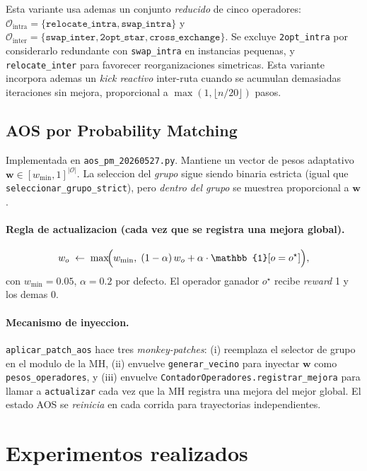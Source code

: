 \documentclass[11pt,a4paper]{article}
\newcommand{\mh}{MH}
\newcommand{\op}[1]{\texttt{#1}}
\newcommand{\code}[1]{\texttt{#1}}
\begin{document}
Esta variante usa ademas un conjunto \emph{reducido} de cinco
operadores: $\mathcal{O}_{\text{intra}}=\{\op{relocate\_intra},
\op{swap\_intra}\}$ y $\mathcal{O}_{\text{inter}}=\{\op{swap\_inter},
\op{2opt\_star}, \op{cross\_exchange}\}$. Se excluye \op{2opt\_intra}
por considerarlo redundante con \op{swap\_intra} en instancias
pequenas, y \op{relocate\_inter} para favorecer reorganizaciones
simetricas. Esta variante incorpora ademas un \emph{kick reactivo}
inter-ruta cuando se acumulan demasiadas iteraciones sin mejora,
proporcional a $\max(1, \lfloor n/20\rfloor)$ pasos.

\subsection{AOS por Probability Matching}

Implementada en \code{aos\_pm\_20260527.py}. Mantiene un vector de
pesos adaptativo $\mathbf{w}\in[w_{\min},1]^{|\mathcal{O}|}$. La
seleccion del \emph{grupo} sigue siendo binaria estricta (igual que
\code{seleccionar\_grupo\_strict}), pero \emph{dentro del grupo} se
muestrea proporcional a $\mathbf{w}$.

\paragraph{Regla de actualizacion (cada vez que se registra una
mejora global).}
\begin{equation}\label{eq:pm}
w_o \;\gets\; \max\!\Bigl(w_{\min},\; (1-\alpha)\,w_o
+ \alpha\cdot \mathbb{1}[o = o^\star]\Bigr),
\end{equation}
con $w_{\min}=0.05$, $\alpha=0.2$ por defecto. El operador
ganador $o^\star$ recibe \emph{reward} 1 y los demas 0.

\paragraph{Mecanismo de inyeccion.} \code{aplicar\_patch\_aos} hace
tres \emph{monkey-patches}: (i) reemplaza el selector de grupo en el
modulo de la \mh{}, (ii) envuelve \code{generar\_vecino} para inyectar
$\mathbf{w}$ como \code{pesos\_operadores}, y (iii) envuelve
\code{ContadorOperadores.registrar\_mejora} para llamar a
\code{actualizar} cada vez que la \mh{} registra una mejora del mejor
global. El estado AOS se \emph{reinicia} en cada corrida para
trayectorias independientes.

\section{Experimentos realizados}\label{sec:experimentos}
\end{document}

